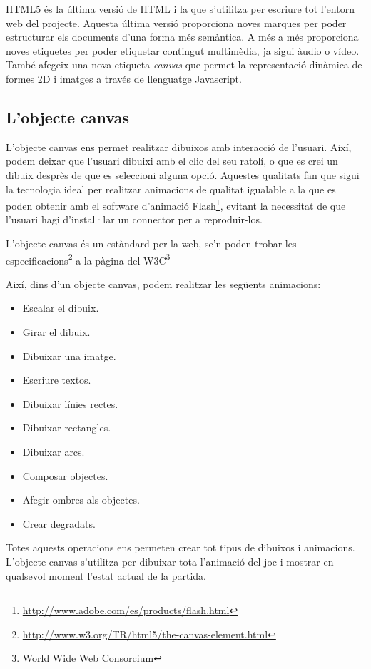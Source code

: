HTML5 és la última versió de HTML i la que s'utilitza per escriure tot l'entorn web del projecte. Aquesta última versió proporciona noves marques per poder estructurar els documents d'una forma més semàntica. A més a més proporciona noves etiquetes per poder etiquetar contingut multimèdia, ja sigui àudio o vídeo. També afegeix una nova etiqueta \emph{canvas} que permet la representació dinàmica de formes 2D i imatges a través de llenguatge Javascript. 

\subsection{L'objecte canvas}

L'objecte canvas ens permet realitzar dibuixos amb interacció de l'usuari. Així, podem deixar que l'usuari dibuixi amb el clic del seu ratolí, o que es crei un dibuix desprès de que es seleccioni alguna opció. Aquestes qualitats fan que sigui la tecnologia ideal per realitzar animacions de qualitat igualable a la que es poden obtenir amb el software d'animació Flash\footnote{\url{http://www.adobe.com/es/products/flash.html}}, evitant la necessitat de que l'usuari hagi d'instal·lar un connector per a reproduir-los. 

L'objecte canvas és un estàndard per la web, se'n poden trobar les especificacions\footnote{\url{http://www.w3.org/TR/html5/the-canvas-element.html}} a la pàgina del W3C\footnote{World Wide Web Consorcium}

Així, dins d'un objecte canvas, podem realitzar les següents animacions: 

\begin{itemize}
\item{Escalar el dibuix.}
\item{Girar el dibuix.}
\item{Dibuixar una imatge.}
\item{Escriure textos.}
\item{Dibuixar línies rectes.}
\item{Dibuixar rectangles.}
\item{Dibuixar arcs.}
\item{Composar objectes.}
\item{Afegir ombres als objectes.}
\item{Crear degradats.}
\end{itemize}

Totes aquests operacions ens permeten crear tot tipus de dibuixos i animacions. L'objecte canvas s'utilitza per dibuixar tota l'animació del joc i mostrar en qualsevol moment l'estat actual de la partida. 


